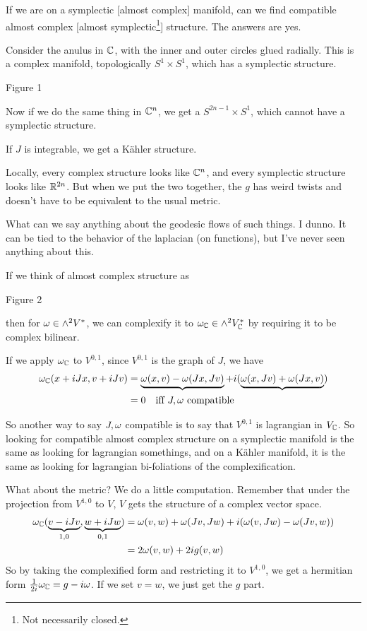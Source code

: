  If we are on a symplectic [almost complex] manifold, can we find
 compatible almost complex [almost symplectic\footnote{Not
 necessarily closed.}] structure.  The answers are yes.

 Consider the anulus in $\mathbb{C}$, with the inner and outer circles
 glued radially.  This is a complex manifold, topologically $S^1\times
 S^1$, which has a symplectic structure.

 Figure 1

 Now if we do the same thing in $\mathbb{C}^n$, we get a $S^{2n-1}\times
 S^1$, which cannot have a symplectic structure.

 If $J$ is integrable, we get a K\"ahler structure.

 Locally, every complex structure looks like $\mathbb{C}^n$, and every
 symplectic structure looks like $\mathbb{R}^{2n}$.  But when we put the
 two together, the $g$ has weird twists and doesn't have to be
 equivalent to the usual metric.

 What can we say anything about the geodesic flows of such things.
 I dunno.  It can be tied to the behavior of the laplacian (on
 functions), but I've never seen anything about this.

 If we think of almost complex structure as

 Figure 2

 then for $\omega \in \wedge^2 V^*$, we can complexify it to
 $\omega_{\mathbb{C}}\in \wedge^2 V^*_{\mathbb{C}}$ by requiring it to be complex
 bilinear.

 If we apply $\omega_{\mathbb{C}}$ to $V^{0,1}$, since $V^{0,1}$ is the graph
 of $J$, we have
 \begin{align*}
    \omega_{\mathbb{C}}(x+iJx,v+iJv) &= \underbrace{\omega(x,v)-\omega(Jx,Jv)} +
    i(\underbrace{\omega(x,Jv)+\omega(Jx,v)})\\
    &=0 \quad \text{if{f} $J,\omega$ compatible}
 \end{align*}

 So another way to say $J,\omega$ compatible is to say that $V^{0,1}$
 is lagrangian in $V_{\mathbb{C}}$.  So looking for compatible almost
 complex structure on a symplectic manifold is the same as looking
 for lagrangian somethings, and on a K\"ahler manifold, it is the
 same as looking for lagrangian bi-foliations of the complexification.

 What about the metric?  We do a little computation.  Remember
 that under the projection from $V^{1,0}$ to $V$, $V$ gets the
 structure of a complex vector space.
 \begin{align*}
   \omega_{\mathbb{C}}(\underbrace{v-iJv}_{1,0},\underbrace{{w+iJw}}_{0,1}) &=
   \omega(v,w)+\omega(Jv,Jw) + i(\omega(v,Jw) - \omega(Jv,w))\\
   &= 2\omega(v,w) + 2i g(v,w)
 \end{align*}
 So by taking the complexified form and restricting it to
 $V^{1,0}$, we get a hermitian form $\frac{1}{2i}\omega_{\mathbb{C}} = g -
 i\omega$.  If we set $v=w$, we just get the $g$ part.

